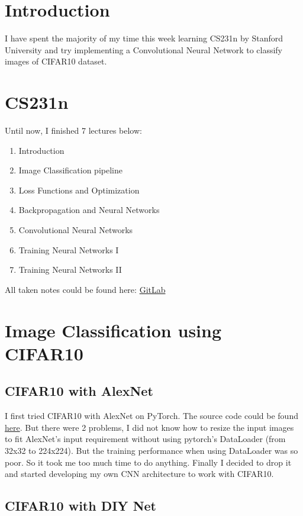 \section{Introduction}
I have spent the majority of my time this week learning CS231n\cite{cs231n} by Stanford University and try implementing a Convolutional Neural Network to classify images of CIFAR10 dataset.

\section{CS231n}
Until now, I finished 7 lectures below:
\begin{enumerate}
\item Introduction
\item Image Classification pipeline
\item Loss Functions and Optimization
\item Backpropagation and Neural Networks
\item Convolutional Neural Networks
\item Training Neural Networks I
\item Training Neural Networks II
\end{enumerate}

All taken notes could be found here: \href{https://gitlab.com/tlvu2697/stanford--cs231n--visual-recognition}{GitLab}


\section{Image Classification using CIFAR10}
\subsection{CIFAR10 with AlexNet}
I first tried CIFAR10\cite{cifar} with AlexNet on PyTorch. The source code could be found \href{https://gitlab.com/tlvu2697/image-classification-cifar10/blob/master/cifar10-classification-alexnet.py}{here}. But there were 2 problems, I did not know how to resize the input images to fit AlexNet's input requirement without using pytorch's DataLoader (from 32x32 to 224x224). But the training performance when using DataLoader was so poor. So it took me too much time to do anything. Finally I decided to drop it and started developing my own CNN architecture to work with CIFAR10.

\newpage
\subsection{CIFAR10 with DIY Net}
